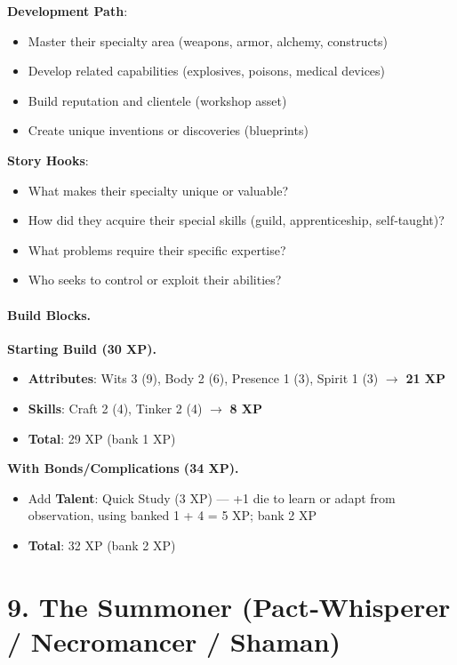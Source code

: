 \textbf{Development Path}:
\begin{itemize}
\item Master their specialty area (weapons, armor, alchemy, constructs)
\item Develop related capabilities (explosives, poisons, medical devices)
\item Build reputation and clientele (workshop asset)
\item Create unique inventions or discoveries (blueprints)
\end{itemize}

\textbf{Story Hooks}:
\begin{itemize}
\item What makes their specialty unique or valuable?
\item How did they acquire their special skills (guild, apprenticeship, self‑taught)?
\item What problems require their specific expertise?
\item Who seeks to control or exploit their abilities?
\end{itemize}

\paragraph{Build Blocks.}
\textbf{Starting Build (30 XP).}
\begin{itemize}
\item \textbf{Attributes}: Wits 3 (9), Body 2 (6), Presence 1 (3), Spirit 1 (3) $\rightarrow$ \textbf{21 XP}
\item \textbf{Skills}: Craft 2 (4), Tinker 2 (4) $\rightarrow$ \textbf{8 XP}
\item \textbf{Total}: 29 XP (bank 1 XP)
\end{itemize}
\textbf{With Bonds/Complications (34 XP).}
\begin{itemize}
\item Add \textbf{Talent}: Quick Study (3 XP) — +1 die to learn or adapt from observation, using banked 1 + 4 = 5 XP; bank 2 XP
\item \textbf{Total}: 32 XP (bank 2 XP)
\end{itemize}

\section{9. The Summoner (Pact‑Whisperer / Necromancer / Shaman)}
\label{sec:concept-summoner}

